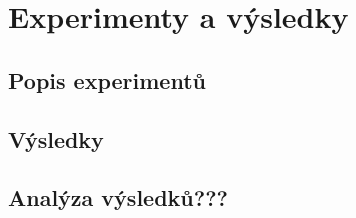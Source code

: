 \chapter{Experimenty a výsledky}

\section{Popis experimentů}

\section{Výsledky}

\section{Analýza výsledků???}





